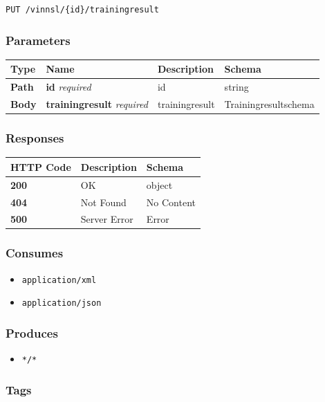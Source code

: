 \begin{verbatim}
PUT /vinnsl/{id}/trainingresult
\end{verbatim}

\subsubsection{Parameters}\label{parameters-7}

\begin{longtable}[]{@{}llll@{}}
\toprule
Type & Name & Description & Schema\tabularnewline
\midrule
\endhead
\textbf{Path} & \textbf{id} \emph{required} & id & string\tabularnewline
\textbf{Body} & \textbf{trainingresult} \emph{required} & trainingresult
& Trainingresultschema\tabularnewline
\bottomrule
\end{longtable}

\subsubsection{Responses}\label{responses-9}

\begin{longtable}[]{@{}lll@{}}
\toprule
HTTP Code & Description & Schema\tabularnewline
\midrule
\endhead
\textbf{200} & OK & object\tabularnewline
\textbf{404} & Not Found & No Content\tabularnewline
\textbf{500} & Server Error & Error\tabularnewline
\bottomrule
\end{longtable}

\subsubsection{Consumes}\label{consumes-5}

\begin{itemize}
\tightlist
\item
  \texttt{application/xml}
\item
  \texttt{application/json}
\end{itemize}

\subsubsection{Produces}\label{produces-9}

\begin{itemize}
\tightlist
\item
  \texttt{*/*}
\end{itemize}

\subsubsection{Tags}\label{tags-9}

